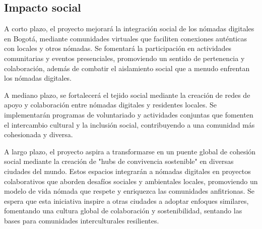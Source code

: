 \subsection{Impacto social}

A corto plazo, el proyecto mejorará la integración social de los nómadas digitales en Bogotá, mediante comunidades virtuales que faciliten conexiones auténticas con locales y otros nómadas. Se fomentará la participación en actividades comunitarias y eventos presenciales, promoviendo un sentido de pertenencia y colaboración, además de combatir el aislamiento social que a menudo enfrentan los nómadas digitales.

A mediano plazo, se fortalecerá el tejido social mediante la creación de redes de apoyo y colaboración entre nómadas digitales y residentes locales. Se implementarán programas de voluntariado y actividades conjuntas que fomenten el intercambio cultural y la inclusión social, contribuyendo a una comunidad más cohesionada y diversa.

A largo plazo, el proyecto aspira a transformarse en un puente global de cohesión social mediante la creación de "hubs de convivencia sostenible" en diversas ciudades del mundo. Estos espacios integrarán a nómadas digitales en proyectos colaborativos que aborden desafíos sociales y ambientales locales, promoviendo un modelo de vida nómada que respete y enriquezca las comunidades anfitrionas. Se espera que esta iniciativa inspire a otras ciudades a adoptar enfoques similares, fomentando una cultura global de colaboración y sostenibilidad, sentando las bases para comunidades interculturales resilientes.
